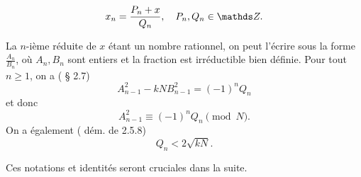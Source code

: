\begin{equation}
	x_n = \frac{P_n + x}{Q_n}, \quad P_n, Q_n \in \Z.
\end{equation}

La $n$-ième réduite de $x$ étant un nombre rationnel, on peut l'écrire sous la
forme $\frac{A_n}{B_n}$, où $A_n, B_n$ sont entiers et la fraction est
irréductible bien définie. Pour tout $n\geqslant 1$, on a (\cite{Lauritzen} §
2.7) \[A_{n-1}^2 - kN B_{n-1}^2 = (-1)^n Q_n\] et donc
\begin{equation}
	A_{n-1}^2 \equiv (-1)^n Q_n \pmod{N}.
\end{equation}
On a également (\cite{Lauritzen} dém. de 2.5.8)
\begin{equation}\label{inegalite}
	Q_n < 2\sqrt{kN}.
\end{equation}

Ces notations et identités seront cruciales dans la suite.
